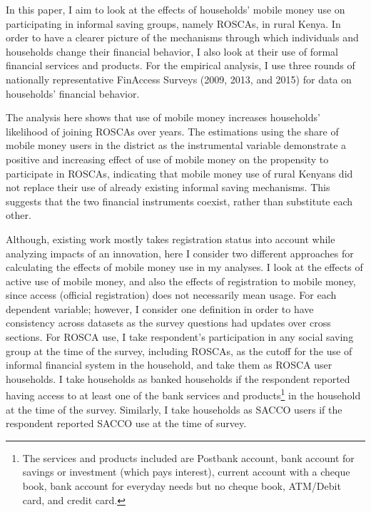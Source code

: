 \documentclass[11pt]{article}
\numberwithin{equation}{section}
\begin{document}
In this paper, I aim to look at the effects of households' mobile money use on participating in informal saving groups, namely ROSCAs, in rural Kenya. In order to have a clearer picture of the mechanisms through which individuals and households change their financial behavior, I also look at their use of formal financial services and products. For the empirical analysis, I use three rounds of nationally representative FinAccess Surveys (2009, 2013, and 2015) for data on households' financial behavior. 

The analysis here shows that use of mobile money increases households' likelihood of joining ROSCAs over years. The estimations using the share of mobile money users in the district as the instrumental variable demonstrate a positive and increasing effect of use of mobile money on the propensity to participate in ROSCAs, indicating that mobile money use of rural Kenyans did not replace their use of already existing informal saving mechanisms. This suggests that the two financial instruments coexist, rather than substitute each other. %

Although, existing work mostly takes registration status into account while analyzing impacts of an innovation, here I consider two different approaches for calculating the effects of mobile money use in my analyses. I look at the effects of active use of mobile money, and also the effects of registration to mobile money, since access (official registration) does not necessarily mean usage. For each dependent variable; however, I consider one definition in order to have consistency across datasets as the survey questions had updates over cross sections. For ROSCA use, I take respondent's participation in any social saving group at the time of the survey, including ROSCAs, as the cutoff for the use of informal financial system in the household, and take them as ROSCA user households. I take households as banked households if the respondent reported having access to at least one of the bank services and products\footnote{The services and products included are Postbank account, bank account for savings or investment (which pays interest), current account with a cheque book, bank account for everyday needs but no cheque book, ATM/Debit card, and credit card.} in the household at the time of the survey. Similarly, I take households as SACCO users if the respondent reported SACCO use at the time of survey.
\end{document}

